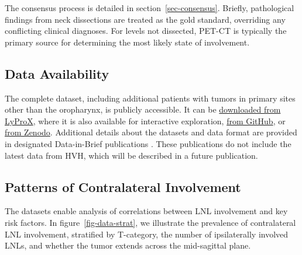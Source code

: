 \documentclass[
  sn-mathphys-num,
]{sn-jnl}
\begin{document}
The consensus process is detailed in section~\ref{sec-consensus}.
Briefly, pathological findings from neck dissections are treated as the
gold standard, overriding any conflicting clinical diagnoses. For levels
not dissected, PET-CT is typically the primary source for determining
the most likely state of involvement.

\subsection{Data Availability}\label{data-availability}

The complete dataset, including additional patients with tumors in
primary sites other than the oropharynx, is publicly accessible. It can
be \href{https://lyprox.org/patients/dataset}{downloaded from LyProX},
where it is also available for interactive exploration,
\href{https://github.com/rmnldwg/lydata}{from GitHub}, or
\href{https://zenodo.org/search?q=lydata}{from Zenodo}. Additional
details about the datasets and data format are provided in designated
Data-in-Brief publications
\citep{ludwig_dataset_2022, ludwig_multicentric_2024}. These
publications do not include the latest data from HVH, which will be
described in a future publication.

\subsection{Patterns of Contralateral Involvement}\label{sec-data-strat}

The datasets enable analysis of correlations between LNL involvement and
key risk factors. In figure~\ref{fig-data-strat}, we illustrate the
prevalence of contralateral LNL involvement, stratified by T-category,
the number of ipsilaterally involved LNLs, and whether the tumor extends
across the mid-sagittal plane.
\end{document}
